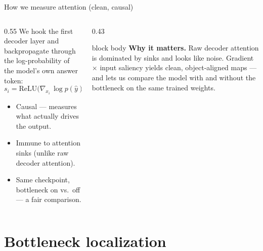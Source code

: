 \documentclass[10pt,aspectratio=169]{beamer}
\begin{document}
\begin{frame}{How we measure attention (clean, causal)}

\begin{columns}[T]
\begin{column}{0.55\textwidth}
We hook the first decoder layer and backpropagate through the log-probability of
the model's own answer token:
\[ s_i = \mathrm{ReLU}\!\Big(\nabla_{x_i}\,\log p(\hat y)\;\cdot\;x_i\Big) \]
\begin{itemize}
  \item Causal --- measures what actually drives the output.
  \item Immune to attention sinks (unlike raw decoder attention).
  \item Same checkpoint, bottleneck on vs.\ off --- a fair comparison.
\end{itemize}
\end{column}

\begin{column}{0.43\textwidth}
\begin{beamercolorbox}[sep=5pt,rounded=true,colsep*=0pt]{block body}
{\footnotesize
\textcolor{paperB}{\textbf{Why it matters.}} Raw decoder attention is dominated
by sinks and looks like noise. Gradient $\times$ input saliency yields clean,
object-aligned maps --- and lets us compare the model with and without the
bottleneck on the same trained weights.}
\end{beamercolorbox}
\end{column}
\end{columns}

\end{frame}

\section{Bottleneck localization}
\end{document}
